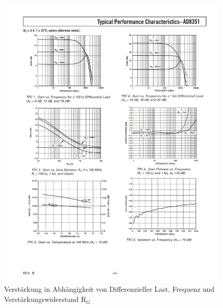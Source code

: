 \begin{figure}[h!]
	\centering
	\includegraphics[width=1.0\textwidth, trim=20mm 180mm 15mm 30mm, clip=true]{images/Gain}
	\caption[Verstärkung in Abhängigkeit von Differenzieller Last, Frequenz und Verstärkungs-widerstand R$_G$]{Verstärkung in Abhängigkeit von Differenzieller Last, Frequenz und Verstärkungswiderstand R$_G$\cite[p. 7]{ad8351}}
	\label{fig:graph_gain}
\end{figure}
\newpage
